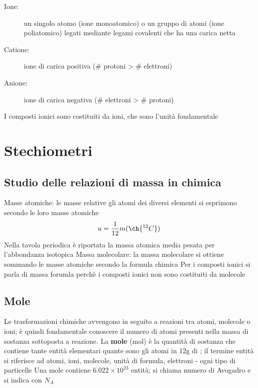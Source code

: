 \documentclass[a4paper,11pt]{report}
\begin{document}
\begin{description}
	\item[Ione:] un singolo atomo (ione monoatomico) o un gruppo di atomi (ione poliatomico) legati mediante legami covalenti che ha una carica netta 
 \item[Catione:] ione di carica positiva (\# protoni > \# elettroni)
 \item[Anione:] ione di carica negativa (\# elettroni > \# protoni)  
\end{description}

\noindent I composti ionici sono costituiti da ioni, che sono l'unità fondamentale

\section{Stechiometri}
\subsection*{Studio delle relazioni di massa in chimica}

Masse atomiche: le masse relative gli atomi dei diversi elementi si esprimono secondo le loro masse atomiche 
\[u = \frac{1}{12}m(\ch{^{12}C})\]
Nella tavola periodica è riportata la massa atomica media pesata per l'abbondanza isotopica \newline
Massa molecolare: la massa molecolare si ottiene sommando le masse atomiche secondo la formula chimica \newline
Per i composti ionici si parla di massa forumla perchè i composti ionici non sono costituiti da molecole 

\subsection*{Mole}
Le trasformazioni chimiche avvengono in seguito a reazioni tra atomi, molecole o ioni; è quindi fondamentale conoscere il numero di atomi presenti nella massa di sostanza sottoposta a reazione. \newline
La \textbf{mole} (mol) è la quantità di sostanza che contiene tante entità elementari quante sono gli atomi in 12g di ; il termine entità si riferisce ad atomi, ioni, molecole, unità di formula, elettroni - ogni tipo di particelle \newline
Una mole contiene $6.022\times 10^{23}$ entità; si chiama numero di Avogadro e si indica con $N_A$
\end{document}
